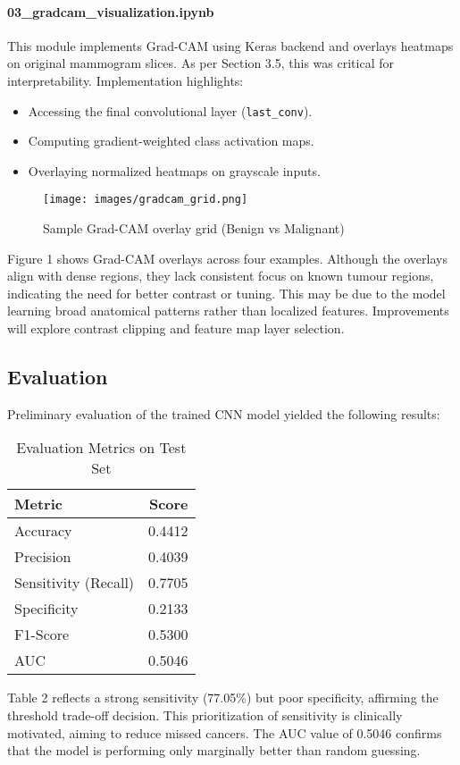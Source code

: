 \documentclass[12pt]{article}
\begin{document}
\paragraph{03\_gradcam\_visualization.ipynb}
This module implements Grad-CAM using Keras backend and overlays heatmaps on original mammogram slices. As per Section 3.5, this was critical for interpretability. Implementation highlights:
\begin{itemize}
    \item Accessing the final convolutional layer (\texttt{last\_conv}).
    \item Computing gradient-weighted class activation maps.
    \item Overlaying normalized heatmaps on grayscale inputs.
\end{itemize}
\begin{figure}[H]
\centering
\texttt{[image: images/gradcam\_grid.png]}
\caption{Sample Grad-CAM overlay grid (Benign vs Malignant)}
\end{figure}
Figure 1 shows Grad-CAM overlays across four examples. Although the overlays align with dense regions, they lack consistent focus on known tumour regions, indicating the need for better contrast or tuning. This may be due to the model learning broad anatomical patterns rather than localized features. Improvements will explore contrast clipping and feature map layer selection.

\subsection{Evaluation}
Preliminary evaluation of the trained CNN model yielded the following results:

\begin{table}[H]
\centering
\caption{Evaluation Metrics on Test Set}
\begin{tabular}{lr}
\toprule
Metric & Score \\
\midrule
Accuracy & 0.4412 \\
Precision & 0.4039 \\
Sensitivity (Recall) & 0.7705 \\
Specificity & 0.2133 \\
F1-Score & 0.5300 \\
AUC & 0.5046 \\
\bottomrule
\end{tabular}
\end{table}

Table 2 reflects a strong sensitivity (77.05\%) but poor specificity, affirming the threshold trade-off decision. This prioritization of sensitivity is clinically motivated, aiming to reduce missed cancers. The AUC value of 0.5046 confirms that the model is performing only marginally better than random guessing.
\end{document}
